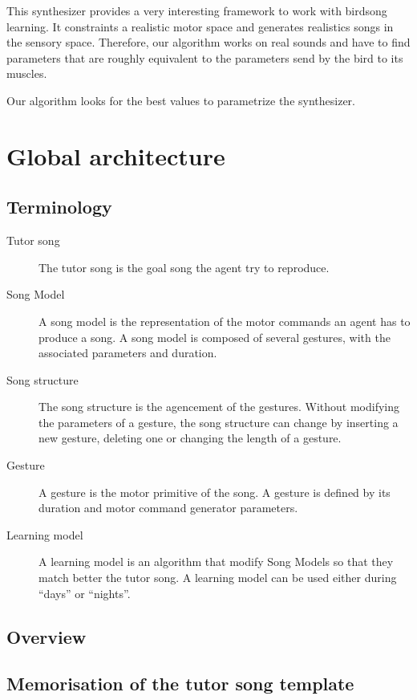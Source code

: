{This synthesizer provides a very interesting framework to work with birdsong
learning. It constraints a realistic motor space and generates realistics songs
in the sensory space. Therefore, our algorithm works on real sounds and have to
find parameters that are roughly equivalent to the parameters send by the bird
to its muscles.


Our algorithm looks for the best values to parametrize the synthesizer.


\section{Global architecture}


\subsection{Terminology}

\begin{description}
  \item[Tutor song] The tutor song is the goal song the agent try to reproduce.
  \item[Song Model] A song model is the representation of the motor commands an
  agent has to produce a song. A song model is composed of several gestures,
  with the associated parameters and duration.
  \item[Song structure] The song structure is the agencement of the gestures.
  Without modifying the parameters of a gesture, the song structure can change
  by inserting a new gesture, deleting one or changing the length of a gesture.
  \item[Gesture] A gesture is the motor primitive of the song. A gesture
  is defined by its duration and motor command generator parameters.
  \item[Learning model] A learning model is an algorithm that modify Song Models
  so that they match better the tutor song. A learning model can be used either
  during ``days'' or ``nights''.
\end{description}

\subsection{Overview}

\subsection{Memorisation of the tutor song template}

}
